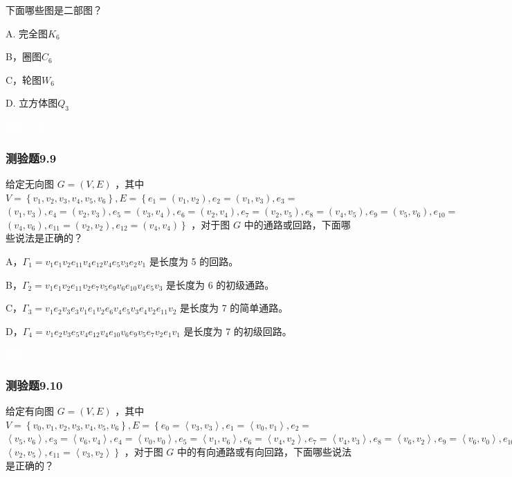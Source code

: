 \documentclass[UTF8, heading=true]{ctexart}
\begin{document}
下面哪些图是二部图？

A. 完全图$K_6$

B，圈图$C_6$

C，轮图$W_6$

D.  立方体图$Q_3$

\textcolor{white}{答案：BD}

\subsubsection{测验题9.9}

给定无向图 $G=(V, E)$ ，其中 $V=\left\{v_1, v_2, v_3, v_4, v_5, v_6\right\}, E=\left\{e_1=\left(v_1, v_2\right), e_2=\left(v_1, v_3\right), e_3=\right.$ $\left(v_1, v_3\right), e_4=\left(v_2, v_3\right), e_5=\left(v_3, v_4\right), e_6=\left(v_2, v_4\right), e_7=\left(v_2, v_5\right), e_8=\left(v_4, v_5\right), e_9=\left(v_5, v_6\right), e_{10}=$ $\left.\left(v_4, v_6\right), e_{11}=\left(v_2, v_2\right), e_{12}=\left(v_4, v_4\right)\right\}$ ，对于图 $G$ 中的通路或回路，下面哪些说法是正确的？

A，$\Gamma_1=v_1 e_1 v_2 e_{11} v_4 e_{12} v_4 e_5 v_3 e_2 v_1$ 是长度为 5 的回路。

B，$\Gamma_2=v_1 e_1 v_2 e_{11} v_2 e_7 v_5 e_9 v_6 e_{10} v_4 e_5 v_3$ 是长度为 6 的初级通路。

C，$\Gamma_3=v_1 e_2 v_3 e_3 v_1 e_1 v_2 e_6 v_4 e_5 v_3 e_4 v_2 e_{11} v_2$ 是长度为 7 的简单通路。

D，$\Gamma_4=v_1 e_2 v_3 e_5 v_4 e_{12} v_4 e_{10} v_6 e_9 v_5 e_7 v_2 e_1 v_1$ 是长度为 7 的初级回路。

\textcolor{white}{答案：C}

\subsubsection{测验题9.10}

给定有向图 $G=(V, E)$ ，其中 $V=\left\{v_0, v_1, v_2, v_3, v_4, v_5, v_6\right\}, E=\left\{e_0=\left\langle v_3, v_3\right\rangle, e_1=\left\langle v_0, v_1\right\rangle, e_2=\right.$ $\left\langle v_5, v_6\right\rangle, e_3=\left\langle v_6, v_4\right\rangle, e_4=\left\langle v_0, v_0\right\rangle, e_5=\left\langle v_1, v_6\right\rangle, e_6=\left\langle v_4, v_2\right\rangle, e_7=\left\langle v_4, v_3\right\rangle, e_8=\left\langle v_6, v_2\right\rangle, e_9=\left\langle v_6, v_0\right\rangle, e_{10}=$ $\left.\left\langle v_2, v_5\right\rangle, \epsilon_{11}=\left\langle v_3, v_2\right\rangle\right\}$ ，对于图 $G$ 中的有向通路或有向回路，下面哪些说法是正确的？
\end{document}
